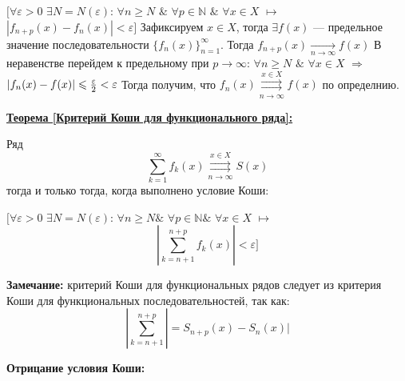\documentclass[a4paper,12pt]{article} %
\renewcommand {\geq}{\geqslant}
\renewcommand {\leq}{\leqslant}
\begin{document}
\hspace*{5mm}$\big[\forall \varepsilon > 0 $  $\exists N = N(\varepsilon)$: $\forall n \geq N$  $\&$ $\forall p \in  \mathds{N}$ $\&$ $\forall x \in X$ $\longmapsto$ \newline 
\hspace*{50mm}$|f_{n+p}(x) -f_n(x)| < \varepsilon\big]$
\newline \newline 
Зафиксируем $x \in X$, тогда $\exists f(x)$ --- предельное значение последовательности $\{f_n(x)\}_{n=1}^\infty$. \newline \newline 
Тогда $f_{n+p}(x) \underset{n \longrightarrow \infty}{\longrightarrow} f(x)$ \newline \newline 
В неравенстве перейдем к предельному при $p \longrightarrow \infty$:\newline 
\hspace*{20mm}$\forall n \geq N$ $\&$ $\forall x \in X$ $\Rightarrow$ $|f_n(x) - f(x)| \leq {\varepsilon \over 2} < \varepsilon$  
\newline \newline 
Тогда получим, что $f_n(x) \overset{x \in X}{\underset{n \rightarrow \infty}{\rightrightarrows}} f(x)$ по определнию.
\newline \newline 

\noindent \underline{\textbf{Теорема [Критерий Коши для функционального ряда]:}}

Ряд $$\sum\limits_{k = 1}^{\infty}  f_k(x) \overset{x \in X}{\underset{n \rightarrow \infty}{\rightrightarrows}} S(x)$$ тогда и только тогда, когда выполнено условие Коши: 
\newline 

\hspace*{5mm}$\big[\forall \varepsilon > 0 $  $\exists N = N(\varepsilon)$: $\forall n \geq N \& $   $\forall p \in  \mathds{N} \&$ $\forall x \in X$ $\longmapsto$ \newline 
\hspace*{50mm}$$|\sum\limits_{k = n+1}^{n+p}f_k(x)| < \varepsilon\big]$$

\textbf{Замечание:} критерий Коши для функциональных рядов следует из критерия Коши для функциональных последовательностей, так как: \newline 
$$|\sum\limits_{k = n+1}^{n+p}| = S_{n+p}(x) - S_n(x)|$$

\textbf{Отрицание условия Коши:} 
\newline 
\end{document}
